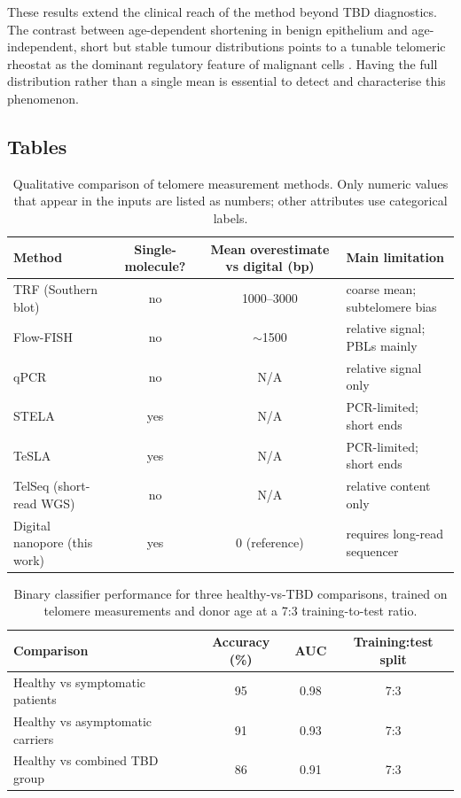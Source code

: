 \documentclass[11pt]{article}
\begin{document}
These results extend the clinical reach of the method beyond TBD
diagnostics. The contrast between age-dependent shortening in benign
epithelium and age-independent, short but stable tumour distributions
points to a tunable telomeric rheostat as the dominant regulatory
feature of malignant cells
\citep{palm2008howshelterin,hockemeyer2015control}. Having the full
distribution rather than a single mean is essential to detect and
characterise this phenomenon.

\subsection{Tables}

\begin{table}[htbp]
\centering
\caption{Qualitative comparison of telomere measurement methods. Only
numeric values that appear in the inputs are listed as numbers; other
attributes use categorical labels.}
\label{tab:methods}
\small
\begin{tabular}{lccl}
\toprule
Method & Single-molecule? & Mean overestimate vs digital (bp) & Main limitation \\
\midrule
TRF (Southern blot)        & no  & 1000--3000 & coarse mean; subtelomere bias \\
Flow-FISH                  & no  & $\sim$1500 & relative signal; PBLs mainly \\
qPCR                       & no  & N/A        & relative signal only \\
STELA                      & yes & N/A        & PCR-limited; short ends \\
TeSLA                      & yes & N/A        & PCR-limited; short ends \\
TelSeq (short-read WGS)    & no  & N/A        & relative content only \\
Digital nanopore (this work) & yes & 0 (reference) & requires long-read sequencer \\
\bottomrule
\end{tabular}
\end{table}

\begin{table}[htbp]
\centering
\caption{Binary classifier performance for three healthy-vs-TBD comparisons,
trained on telomere measurements and donor age at a 7:3 training-to-test ratio.}
\label{tab:classifier}
\begin{tabular}{lccc}
\toprule
Comparison & Accuracy (\%) & AUC & Training:test split \\
\midrule
Healthy vs symptomatic patients     & 95 & 0.98 & 7:3 \\
Healthy vs asymptomatic carriers    & 91 & 0.93 & 7:3 \\
Healthy vs combined TBD group       & 86 & 0.91 & 7:3 \\
\bottomrule
\end{tabular}
\end{table}
\end{document}
